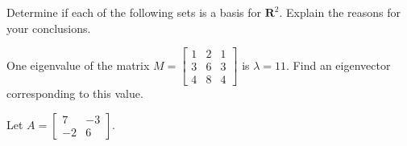 \documentclass[12pt]{exam}
\newcommand{\real}{\mathbf{R}}
\begin{document}
\begin{questions}
\question[10]
Determine if each of the following sets is a basis for $\real^2$.  Explain the reasons for your conclusions.

\begin{parts}
\part
$\left\lbrace \left[
\begin{array}{c}
-3 \\ 19 
\end{array}
\right], 
\left[
\begin{array}{c}
12 \\ -5 
\end{array}
\right]
\right\rbrace$

\part
$\left\lbrace \left[
\begin{array}{c}
2 \\ 4 
\end{array}
\right], 
\left[
\begin{array}{c}
9 \\ 18 
\end{array}
\right]
\right\rbrace$
\end{parts}

\question[7]
One eigenvalue of the matrix $M =
\left[ \begin{array}{ccc}
1 & 2 & 1 \\ 3 & 6 & 3 \\ 4 & 8 & 4
\end{array}
\right]$
is $\lambda = 11$.  Find an eigenvector corresponding to this value.

\question[22]
Let $A =
\left[ \begin{array}{cc}
7 & -3 \\ -2 & 6
\end{array}
\right]$.  

\end{questions}
\end{document}
